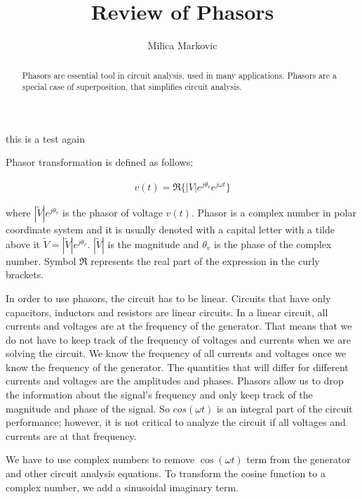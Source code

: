 \documentclass{ximera}
\title{Review of Phasors}
\author{Milica Markovic}
\begin{document}
  
\begin{abstract}  
Phasors are essential tool in circuit analysis, used in many applications. Phasors are a special case of superposition, that simplifies circuit analysis. 
\end{abstract}  
\maketitle    

this is a test again 

\begin{definition}
Phasor transformation is defined as follows:

\begin{eqnarray}
v(t)=\Re\{|V|e^{j\theta_v} e^{j \omega t}\}
\end{eqnarray}

where $|\widetilde{V}|e^{j\theta_v}$ is the phasor of voltage $v(t)$. Phasor is a complex number in polar coordinate system and it is usually denoted with a capital letter with a tilde above it $\widetilde{V} = |\widetilde{V}|e^{j\theta_v}$. $ |\widetilde{V}|$ is the magnitude and $\theta_v$ is the phase of the complex number. Symbol $\Re$ represents the real part of the expression in the curly brackets. 

\end{definition}



In order to use phasors, the circuit has to be linear. Circuits that have  only capacitors, inductors and resistors are 
linear circuits.  In a  linear circuit, all currents and voltages are at the frequency of the generator. That means that we do not have to keep track of the frequency of voltages and currents when we are solving the circuit. We know the frequency of all currents and voltages once we know the frequency of the generator. The quantities that will differ for different currents and voltages are the amplitudes and phases. Phasors allow us to drop the information about the signal's frequency and only keep track of the magnitude and phase of the signal. So $cos (\omega t)$ is an integral part of the circuit performance; however, it is not critical to analyze the circuit if all voltages and currents are at that frequency.


 We have to use complex numbers to remove $ \cos (\omega t)$  term from the generator and other circuit analysis equations.  To transform the cosine function to a complex number, we add a sinusoidal imaginary term.
\end{document}
